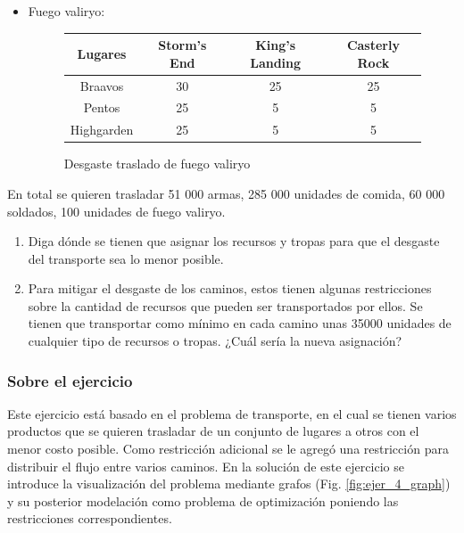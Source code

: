 \documentclass[a4paper,10pt,twocolumn]{article}
\theoremstyle{theorem}
\theoremstyle{definition}
\theoremstyle{remark}
\begin{document}
\begin{itemize}
\item Fuego valiryo:

\begin{figure}[h!]%
	\begin{center}
		\begin{tabular}{|c|c|c|c|} \hline
		Lugares	& Storm's End		& King's Landing		& Casterly Rock	\\ \hline
		Braavos		& 30		& 25		& 25	\\ \hline
		Pentos		& 25		&  5		&  5	\\ \hline
		Highgarden		& 25		&  5		&  5	\\ \hline
		\end{tabular}
	\caption{Desgaste traslado de fuego valiryo}\label{fig:ejer_4_4}
	\end{center}
\end{figure}


\end{itemize}

En total se quieren trasladar 51 000 armas, 285 000 unidades de comida, 60 000 soldados, 100 unidades de fuego valiryo.

\renewcommand{\theenumi}{\alph{enumi}} %

\begin{enumerate}

	\item Diga dónde se tienen que asignar los recursos y tropas para que el desgaste del transporte sea lo menor posible.
	\item Para mitigar el desgaste de los caminos, estos tienen algunas restricciones sobre la cantidad de recursos que pueden ser 
	transportados por ellos. Se tienen que transportar como mínimo en cada camino unas 35000 unidades de cualquier tipo de recursos o tropas. 
	¿Cuál sería la nueva asignación?

\end{enumerate}

		\subsubsection{Sobre el ejercicio}\label{subsubsec:sobre_ejer_4}

Este ejercicio está basado en el problema de transporte, en el cual se tienen varios productos que se quieren trasladar de un conjunto de lugares a otros con el menor costo posible. Como restricción adicional se le agregó una restricción para distribuir el flujo entre varios caminos. En la solución de este ejercicio se introduce la visualización del problema mediante grafos (Fig. \ref{fig:ejer_4_graph}) y su posterior modelación como problema de optimización poniendo las restricciones correspondientes.
\end{document}
